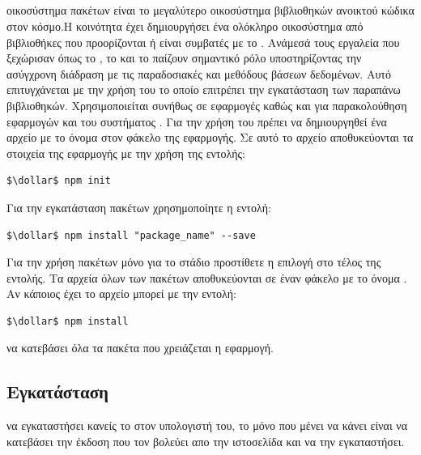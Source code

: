 \subsection*{}
 οικοσύστημα πακέτων  είναι το μεγαλύτερο οικοσύστημα βιβλιοθηκών ανοικτού κώδικα στον κόσμο.Η κοινότητα έχει δημιουργήσει ένα ολόκληρο οικοσύστημα από βιβλιοθήκες που προορίζονται ή είναι συμβατές με το . Ανάμεσά τους εργαλεία που ξεχώρισαν όπως το , το  και το  παίζουν σημαντικό ρόλο υποστηρίζοντας την ασύγχρονη διάδραση με τις παραδοσιακές και  μεθόδους βάσεων δεδομένων. Αυτό επιτυγχάνεται με την χρήση του  το οποίο επιτρέπει την εγκατάσταση των παραπάνω βιβλιοθηκών. Χρησιμοποιείται συνήθως σε εφαρμογές  καθώς και για παρακολούθηση εφαρμογών και του συστήματος 
. Για την χρήση του  πρέπει να δημιουργηθεί ένα αρχείο με το όνομα  στον φάκελο της εφαρμογής. Σε αυτό το αρχείο αποθυκεύονται τα στοιχεία της εφαρμογής με την χρήση της εντολής: 
    \begin{lstlisting}[language=command.com]
    $\dollar$ npm init
    \end{lstlisting}
     Για την εγκατάσταση πακέτων χρησημοποίητε η εντολή: 
    \begin{lstlisting}[language=command.com]
    $\dollar$ npm install "package_name" --save
    \end{lstlisting}
     Για την χρήση πακέτων μόνο για το  στάδιο προστίθετε η επιλογή  στο τέλος της εντολής. Τα αρχεία όλων των πακέτων αποθυκεύονται σε έναν φάκελο με το όνομα . Αν κάποιος έχει το αρχείο  μπορεί με την εντολή:
    \begin{lstlisting}[language=command.com]
    $\dollar$ npm install
    \end{lstlisting}
     να κατεβάσει όλα τα πακέτα που χρειάζεται η εφαρμογή.
 
\subsection*{Εγκατάσταση}
 να εγκαταστήσει κανείς το  στον υπολογιστή του, το μόνο που μένει να κάνει είναι να κατεβάσει την έκδοση που τον βολεύει απο την ιστοσελίδα \newline{} και να την εγκαταστήσει. 

